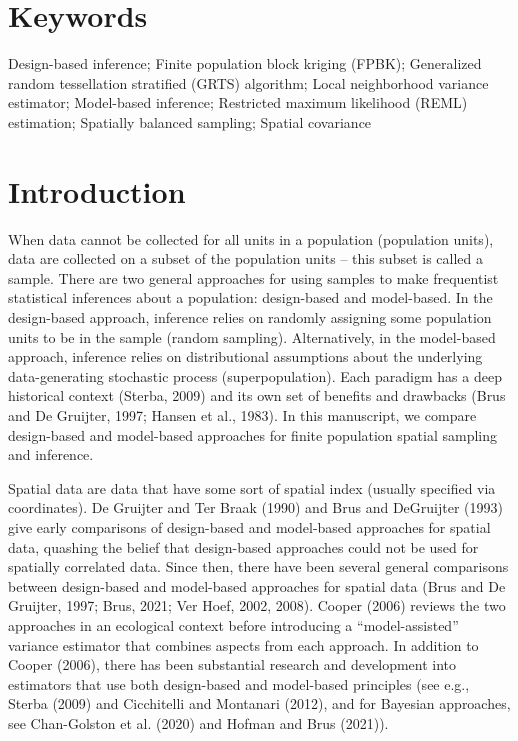 \documentclass[]{elsarticle} %
\begin{document}
\hypertarget{keywords}{%
\section*{Keywords}\label{keywords}}

Design-based inference; Finite population block kriging (FPBK);
Generalized random tessellation stratified (GRTS) algorithm; Local
neighborhood variance estimator; Model-based inference; Restricted
maximum likelihood (REML) estimation; Spatially balanced sampling;
Spatial covariance

\hypertarget{sec:introduction}{%
\section{Introduction}\label{sec:introduction}}

When data cannot be collected for all units in a population (population
units), data are collected on a subset of the population units -- this
subset is called a sample. There are two general approaches for using
samples to make frequentist statistical inferences about a population:
design-based and model-based. In the design-based approach, inference
relies on randomly assigning some population units to be in the sample
(random sampling). Alternatively, in the model-based approach, inference
relies on distributional assumptions about the underlying
data-generating stochastic process (superpopulation). Each paradigm has
a deep historical context (Sterba, 2009) and its own set of benefits and
drawbacks (Brus and De Gruijter, 1997; Hansen et al., 1983). In this
manuscript, we compare design-based and model-based approaches for
finite population spatial sampling and inference.

Spatial data are data that have some sort of spatial index (usually
specified via coordinates). De Gruijter and Ter Braak (1990) and Brus
and DeGruijter (1993) give early comparisons of design-based and
model-based approaches for spatial data, quashing the belief that
design-based approaches could not be used for spatially correlated data.
Since then, there have been several general comparisons between
design-based and model-based approaches for spatial data (Brus and De
Gruijter, 1997; Brus, 2021; Ver Hoef, 2002, 2008). Cooper (2006) reviews
the two approaches in an ecological context before introducing a
``model-assisted'' variance estimator that combines aspects from each
approach. In addition to Cooper (2006), there has been substantial
research and development into estimators that use both design-based and
model-based principles (see e.g., Sterba (2009) and Cicchitelli and
Montanari (2012), and for Bayesian approaches, see Chan-Golston et al.
(2020) and Hofman and Brus (2021)).
\end{document}
